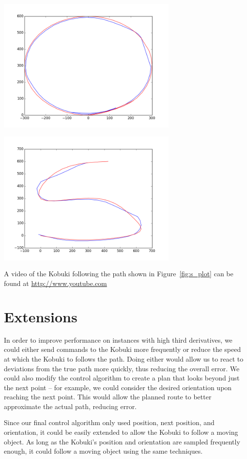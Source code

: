 \documentclass[10pt]{article}
\newenvironment{Figure}
  {\par\medskip\noindent\minipage{\linewidth}}
  {\endminipage\par\medskip}
\def\videolink{\url{http://www.youtube.com}}
\begin{document}
\begin{multicols*}{2}
  \begin{Figure}
    \includegraphics[width=9cm]{../plots/circle_plot.png}
    \label{fig:circ_plot}
  \end{Figure}

  \begin{Figure}
    \includegraphics[width=9cm]{../plots/s_plot.png}
     \label{fig:s_plot}
  \end{Figure}

  A video of the Kobuki following the path shown in Figure~\ref{fig:s_plot} can
  be found at \videolink{}

  \section*{Extensions}
  In order to improve performance on instances with high third derivatives, we
  could either send commands to the Kobuki more frequently or reduce the speed
  at which the Kobuki to follows the path. Doing either would allow us to react
  to deviations from the true path more quickly, thus reducing the overall
  error. We could also modify the control algorithm to create a plan that looks
  beyond just the next point -- for example, we could consider the desired
  orientation upon reaching the next point. This would allow the planned route
  to better approximate the actual path, reducing error.

  Since our final control algorithm only used position, next position, and
  orientation, it could be easily extended to allow the Kobuki to follow a
  moving object. As long as the Kobuki's position and orientation are sampled
  frequently enough, it could follow a moving object using the same techniques.
\end{multicols*}


\end{document}
